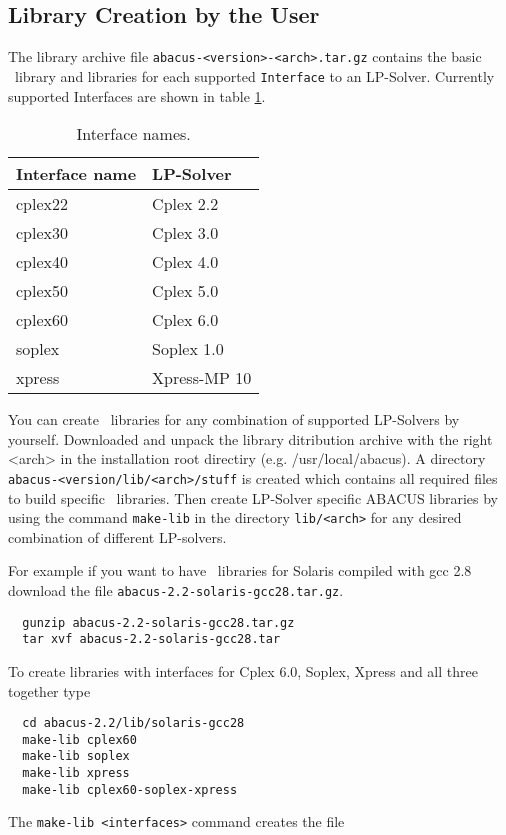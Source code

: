 \subsection{Library Creation by the User}

The library archive file {\tt abacus-<version>-<arch>.tar.gz} contains
the basic \ABACUS\ library and libraries for each supported
{\tt Interface} to an LP-Solver. Currently supported Interfaces are
shown in table \ref{table:interfaces}.

\begin{table}[htp]
\begin{center}
\begin{tabular}{|l|l|}
\hline
Interface name & LP-Solver\\
\hline
cplex22 &                       Cplex 2.2 \\
cplex30 &                       Cplex 3.0 \\
cplex40 &                       Cplex 4.0 \\
cplex50 &                       Cplex 5.0 \\
cplex60 &                       Cplex 6.0 \\
soplex  &                       Soplex 1.0 \\
xpress  &                       Xpress-MP 10 \\
\hline
\end{tabular}
\caption{Interface names.}
\label{table:interfaces}
\end{center}
\end{table}

You can create \ABACUS\ libraries for any combination of supported
LP-Solvers by yourself.
Downloaded and unpack the library ditribution archive with the right
<arch> in the installation root directiry (e.g. /usr/local/abacus).
A directory {\tt abacus-<version/lib/<arch>/stuff} is created which
contains all required files to build specific \ABACUS\ libraries.
Then create LP-Solver specific ABACUS libraries by using the command
{\tt make-lib} in the directory {\tt lib/<arch>} for any desired
combination of different LP-solvers.

For example if you want to have \ABACUS\ libraries for Solaris compiled
with gcc 2.8 download the file {\tt abacus-2.2-solaris-gcc28.tar.gz}.
\begin{verbatim}
  gunzip abacus-2.2-solaris-gcc28.tar.gz
  tar xvf abacus-2.2-solaris-gcc28.tar
\end{verbatim}
To create libraries with interfaces for Cplex 6.0, Soplex, Xpress and
all three together type
\begin{verbatim}
  cd abacus-2.2/lib/solaris-gcc28
  make-lib cplex60
  make-lib soplex
  make-lib xpress
  make-lib cplex60-soplex-xpress
\end{verbatim}
The {\tt make-lib <interfaces>} command creates the file


